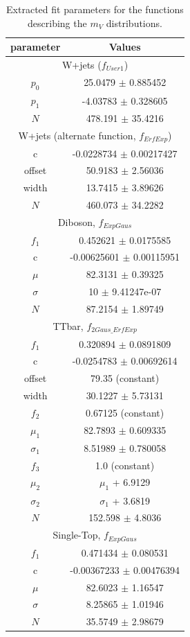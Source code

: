 \begin{table}[!htbp]
	\centering
	\begin{tabular}{||c | c||} 
	 \hline
	  parameter & Values \\
	 \hline \hline
	 \multicolumn{2}{|c|}{W+jets ($f_{User1}$)}\\
	 \hline
	 $p_0$		&	25.0479 $\pm$ 0.885452\\
	 $p_1$		&	-4.03783 $\pm$ 0.328605\\
	 $N$		&	478.191 $\pm$ 35.4216\\
	 \hline \hline
	 \multicolumn{2}{|c|}{W+jets (alternate function, $f_{ErfExp}$)}\\
	 \hline
	 c 			&	-0.0228734 $\pm$ 0.00217427\\
	 offset 	&	50.9183 $\pm$ 2.56036\\
	 width 		&	13.7415 $\pm$ 3.89626\\
	 $N$		&	460.073 $\pm$ 34.2282\\
	 \hline \hline
	 \multicolumn{2}{|c|}{Diboson, $f_{ExpGaus}$}\\
	 \hline 
	 $f_1$		&	0.452621 $\pm$ 0.0175585\\
	 c 			&	-0.00625601 $\pm$ 0.00115951 \\
	 $\mu$		&	82.3131 $\pm$ 0.39325\\
	 $\sigma$	&	10 $\pm$ 9.41247e-07\\
	 $N$		&	87.2154 $\pm$ 1.89749\\
	 \hline \hline
	 \multicolumn{2}{|c|}{TTbar, $f_{2Gaus\_ErfExp}$}\\
	 \hline 
	 $f_1$		&	0.320894 $\pm$ 0.0891809\\
	 c 			&	-0.0254783 $\pm$ 0.00692614\\
	 offset 	&	79.35 (constant)\\
	 width 		&	30.1227 $\pm$ 5.73131\\
	 $f_2$		&	0.67125 (constant)\\
	 $\mu_1$	&	82.7893 $\pm$ 0.609335\\
	 $\sigma_1$	&	8.51989 $\pm$ 0.780058\\
	 $f_3$		&	1.0 (constant)\\
	 $\mu_2$	&	$\mu_1$ + 6.9129 \\
	 $\sigma_2$	&	$\sigma_1$ + 3.6819\\
	 $N$		&	152.598 $\pm$ 4.8036\\
	 \hline \hline
	 \multicolumn{2}{|c|}{Single-Top, $f_{ExpGaus}$}\\
	 \hline 
	 $f_1$		&	0.471434 $\pm$ 0.080531\\
	 c 			&	-0.00367233 $\pm$ 0.00476394 \\
	 $\mu$		&	82.6023 $\pm$ 1.16547\\
	 $\sigma$	&	8.25865 $\pm$ 1.01946\\
	 $N$		&	35.5749 $\pm$ 2.98679\\
	 \hline 
	\end{tabular}
 	\caption{Extracted fit parameters for the functions describing the $m_{V}$ distributions.}
 	\label{Table:BackgroundEst_fitPars}
\end{table}
